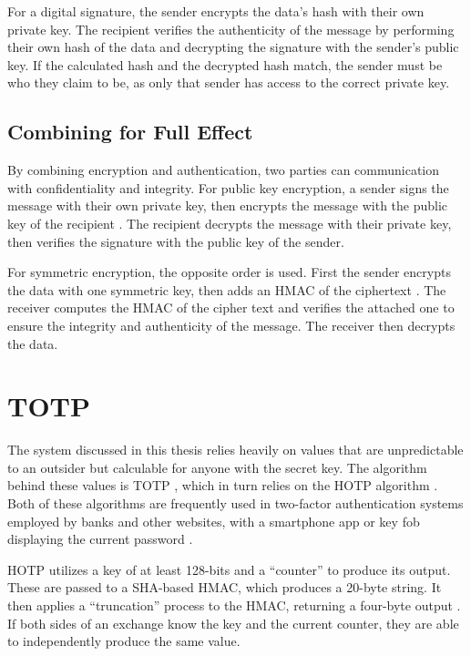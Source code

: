 \par For a digital signature, the sender encrypts the data's hash with their own private key. The recipient verifies the authenticity of the message by performing their own hash of the data and decrypting the signature with the sender's public key. If the calculated hash and the decrypted hash match, the sender must be who they claim to be, as only that sender has access to the correct private key.

\subsection{Combining for Full Effect}
\label{sec:auth_and_encrypt}
\par By combining encryption and authentication, two parties can communication with confidentiality and integrity. For public key encryption, a sender signs the message with their own private key, then encrypts the message with the public key of the recipient \cite{An01authenticatedencryption}. The recipient decrypts the message with their private key, then verifies the signature with the public key of the sender.

\par For symmetric encryption, the opposite order is used. First the sender encrypts the data with one symmetric key, then adds an \ac{HMAC} of the ciphertext \cite{AuthEncryptThenMAC}. The receiver computes the \ac{HMAC} of the cipher text and verifies the attached one to ensure the integrity and authenticity of the message. The receiver then decrypts the data.

\section{\acf{TOTP}}
\label{sec:totp}
\par The system discussed in this thesis relies heavily on values that are unpredictable to an outsider but calculable for anyone with the secret key. The algorithm behind these values is \acf{TOTP} \cite{rfc6238}, which in turn relies on the \ac{HOTP} algorithm \cite{rfc4226}. Both of these algorithms are frequently used in two-factor authentication systems employed by banks and other websites, with a smartphone app or key fob displaying the current password \cite{TwoFactorPhones}.

\par \ac{HOTP} utilizes a key of at least 128-bits and a ``counter'' to produce its output. These are passed to a \ac{SHA}-based \ac{HMAC}, which produces a 20-byte string. It then applies a ``truncation'' process to the \ac{HMAC}, returning a four-byte output \cite{rfc4226}. If both sides of an exchange know the key and the current counter, they are able to independently produce the same value.

